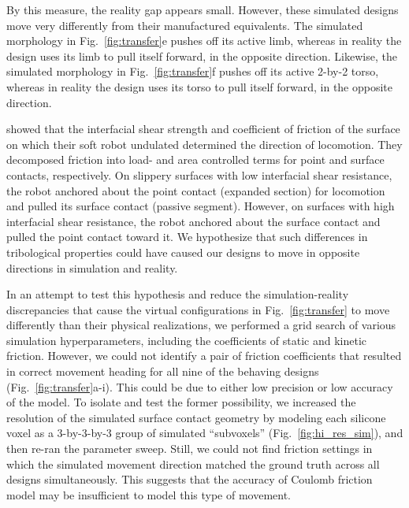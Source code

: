 By this measure, the reality gap appears small.
However, these simulated designs move very differently from their manufactured equivalents.
The simulated morphology in Fig.~\ref{fig:transfer}e pushes off its active limb, whereas in reality the design uses its limb to pull itself forward, in the opposite direction.
Likewise, the simulated morphology in Fig.~\ref{fig:transfer}f pushes off its active 2-by-2 torso, whereas in reality the design uses its torso to pull itself forward, in the opposite direction.

\citet{majidi2013influence} showed that the interfacial shear strength and coefficient of friction of the surface on which their soft robot undulated determined the direction of locomotion. They decomposed friction into load- and area controlled terms for point and surface contacts, respectively. 
On slippery surfaces with low interfacial shear resistance, the robot anchored about the point contact (expanded section) for locomotion and pulled its surface contact (passive segment). However, on surfaces with high interfacial shear resistance, the robot anchored about the surface contact and pulled the point contact toward it. 
We hypothesize that such differences in tribological properties could have caused our designs to move in opposite directions in simulation and reality.

In an attempt to test this hypothesis and reduce the simulation-reality discrepancies that cause the virtual configurations in Fig.~\ref{fig:transfer} to move differently than their physical realizations, we performed a grid search of various simulation hyperparameters, including the coefficients of static and kinetic friction.
However, we could not identify a pair of friction coefficients that resulted in correct movement heading for all nine of the behaving designs (Fig.~\ref{fig:transfer}a\textquotesingle-i\textquotesingle).
This could be due to either low precision or low accuracy of the model.
To isolate and test the former possibility, we increased the resolution of the simulated surface contact geometry by modeling each silicone voxel as a 3-by-3-by-3 group of simulated ``subvoxels'' (Fig.~\ref{fig:hi_res_sim}),
and then re-ran the parameter sweep.
Still, we could not find friction settings in which the simulated movement direction matched the ground truth across all designs simultaneously.
This suggests that the accuracy of Coulomb friction model may be insufficient to model this type of movement.

